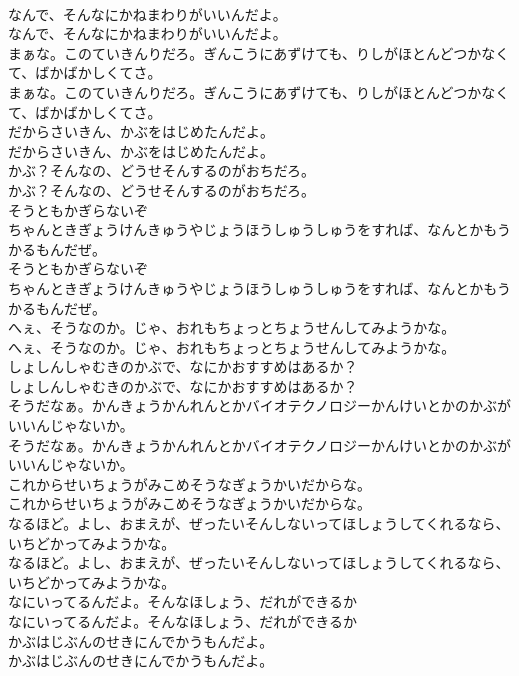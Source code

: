 \documentclass[8pt]{extreport}
\begin{document}
\begin{CJK}{UTF8}{min}
\\	なんで、そんなにかねまわりがいいんだよ。
\\	なんで、そんなにかねまわりがいいんだよ。
\\	まぁな。このていきんりだろ。ぎんこうにあずけても、りしがほとんどつかなくて、ばかばかしくてさ。
\\	まぁな。このていきんりだろ。ぎんこうにあずけても、りしがほとんどつかなくて、ばかばかしくてさ。
\\	だからさいきん、かぶをはじめたんだよ。
\\	だからさいきん、かぶをはじめたんだよ。
\\	かぶ？そんなの、どうせそんするのがおちだろ。
\\	かぶ？そんなの、どうせそんするのがおちだろ。
\\	そうともかぎらないぞ
\\	ちゃんときぎょうけんきゅうやじょうほうしゅうしゅうをすれば、なんとかもうかるもんだぜ。
\\	そうともかぎらないぞ
\\	ちゃんときぎょうけんきゅうやじょうほうしゅうしゅうをすれば、なんとかもうかるもんだぜ。
\\	へぇ、そうなのか。じゃ、おれもちょっとちょうせんしてみようかな。
\\	へぇ、そうなのか。じゃ、おれもちょっとちょうせんしてみようかな。
\\	しょしんしゃむきのかぶで、なにかおすすめはあるか？
\\	しょしんしゃむきのかぶで、なにかおすすめはあるか？
\\	そうだなぁ。かんきょうかんれんとかバイオテクノロジーかんけいとかのかぶがいいんじゃないか。
\\	そうだなぁ。かんきょうかんれんとかバイオテクノロジーかんけいとかのかぶがいいんじゃないか。
\\	これからせいちょうがみこめそうなぎょうかいだからな。
\\	これからせいちょうがみこめそうなぎょうかいだからな。
\\	なるほど。よし、おまえが、ぜったいそんしないってほしょうしてくれるなら、いちどかってみようかな。
\\	なるほど。よし、おまえが、ぜったいそんしないってほしょうしてくれるなら、いちどかってみようかな。
\\	なにいってるんだよ。そんなほしょう、だれができるか
\\	なにいってるんだよ。そんなほしょう、だれができるか
\\	かぶはじぶんのせきにんでかうもんだよ。
\\	かぶはじぶんのせきにんでかうもんだよ。

\end{CJK}
\end{document}

